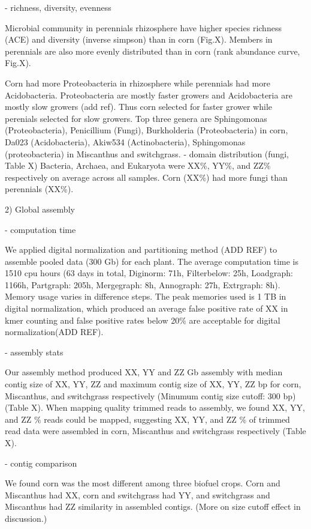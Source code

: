 \documentclass[12pt]{article}
\begin{document}
- richness, diversity, evenness

Microbial community in perennials rhizosphere have higher species richness (ACE) and diversity (inverse simpson) than in corn (Fig.X). Members in perennials are also more evenly distributed than in corn (rank abundance curve, Fig.X).

Corn had more Proteobacteria in rhizosphere while perennials had more Acidobacteria. Proteobacteria are mostly faster growers and Acidobacteria are mostly slow growers (add ref). Thus corn selected for faster grower while perenials selected for slow growers. Top three genera are Sphingomonas (Proteobacteria), Penicillium (Fungi), Burkholderia (Proteobacteria) in corn, Da023 (Acidobacteria), Akiw534 (Actinobacteria), Sphingomonas (proteobacteria) in Miscanthus and switchgrass. 
- domain distribution (fungi, Table X)
Bacteria, Archaea, and Eukaryota were XX\%, YY\%, and ZZ\% respectively on average across all samples. Corn (XX\%) had more fungi than perennials (XX\%).
  
2) Global assembly

- computation time

We applied digital normalization and partitioning method (ADD REF) to assemble pooled data (300 Gb) for each plant. The average computation time is 1510 cpu hours (63 days in total, Diginorm: 71h, Filterbelow: 25h, Loadgraph: 1166h, Partgraph: 205h, Mergegraph: 8h, Annograph: 27h, Extrgraph: 8h). Memory usage varies in difference steps. The peak memories used is 1 TB in digital normalization, which produced an average false positive rate of XX in kmer counting and false positive rates below 20\% are acceptable for digital normalization(ADD REF). 

- assembly stats

Our assembly method produced  XX, YY and ZZ Gb assembly with median contig size of XX, YY, ZZ and maximum contig size of XX, YY, ZZ bp for corn, Miscanthus, and switchgrass respectively (Minumum contig size cutoff: 300 bp)(Table X). When mapping quality trimmed reads to assembly, we found XX, YY, and ZZ \% reads could be mapped, suggesting XX, YY, and ZZ \% of trimmed read data were assembled in corn, Miscanthus and switchgrass respectively (Table X).

- contig comparison

We found corn was the most different among three biofuel crops.  Corn and Miscanthus had XX, corn and switchgrass had YY, and switchgrass and Miscanthus had ZZ similarity in assembled contigs. (More on size cutoff effect in discussion.)
\end{document}
